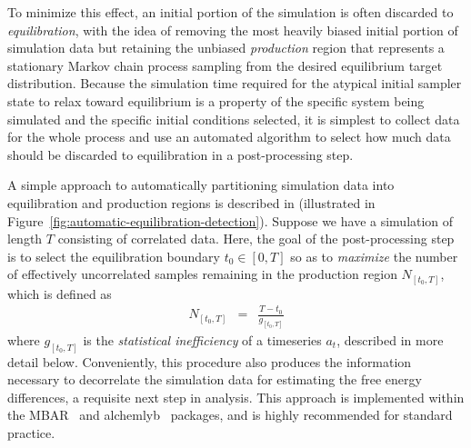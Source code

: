\documentclass[9pt,bestpractices]{livecoms}
\begin{document}
To minimize this effect, an initial portion of the simulation is often discarded to \emph{equilibration}, with the idea of removing the most heavily biased initial portion of simulation data but retaining the unbiased \emph{production} region that represents a stationary Markov chain process sampling from the desired equilibrium target distribution.
Because the simulation time required for the atypical initial sampler state to relax toward equilibrium is a property of the specific system being simulated and the specific initial conditions selected, it is simplest to collect data for the whole process and use an automated algorithm to select how much data should be discarded to equilibration in a post-processing step.

A simple approach to automatically partitioning simulation data into equilibration and production regions is described in \cite{chodera2016simple} (illustrated in Figure~\ref{fig:automatic-equilibration-detection}).
Suppose we have a simulation of length $T$ consisting of correlated data.
Here, the goal of the post-processing step is to select the equilibration boundary $t_0 \in [0, T]$ so as to \emph{maximize} the number of effectively uncorrelated samples remaining in the production region $N_{[t_0,T]}$, which is defined as
\begin{eqnarray}
N_{[t_0,T]} &=& \frac{T - t_0}{g_{[t_0,T]}}
\end{eqnarray}
where $g_{[t_0,T]}$ is the \emph{statistical inefficiency} of a timeseries $a_t$, described in more detail below.
Conveniently, this procedure also produces the information necessary to decorrelate the simulation data for estimating the free energy differences, a requisite next step in analysis.
This approach is implemented within the MBAR~\cite{mbar} and alchemlyb~\cite{alchemlyb} packages, and is highly recommended for standard practice.
\end{document}
